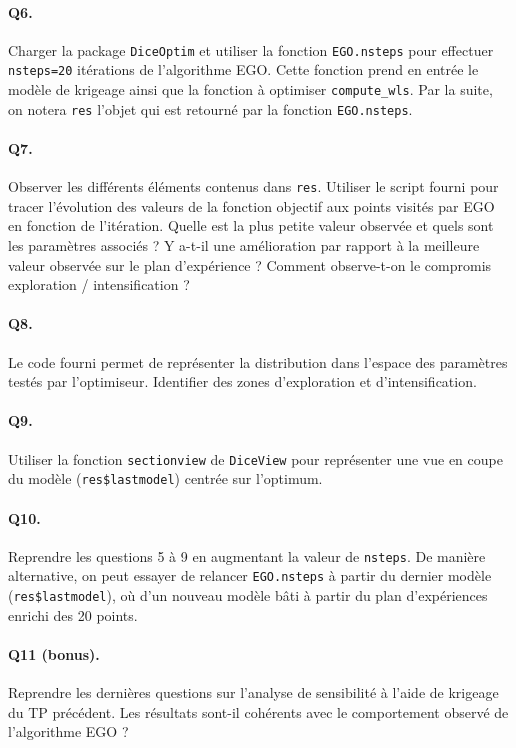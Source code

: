 \documentclass[12pt]{scrartcl}
\begin{document}
\paragraph{Q6. } Charger la package \texttt{DiceOptim} et utiliser la fonction \texttt{EGO.nsteps} pour effectuer \texttt{nsteps=20} itérations de l'algorithme EGO. 
Cette fonction prend en entrée le modèle de krigeage ainsi que la fonction à optimiser \texttt{compute\_wls}. Par la suite, on notera \texttt{res} l'objet qui est retourné par la fonction \texttt{EGO.nsteps}.

\paragraph{Q7. } Observer les différents éléments contenus dans \texttt{res}. Utiliser le script fourni pour tracer l'évolution des valeurs de la fonction objectif aux points visités par EGO en fonction de l'itération. 
Quelle est la plus petite valeur observée et quels sont les paramètres associés ? Y a-t-il une amélioration par rapport à la meilleure valeur observée sur le plan d'expérience ?
Comment observe-t-on le compromis exploration / intensification ?

\paragraph{Q8. } Le code fourni permet de représenter la distribution dans l'espace des paramètres testés par l'optimiseur. Identifier des zones d'exploration et d'intensification.

\paragraph{Q9. } Utiliser la fonction \texttt{sectionview} de \texttt{DiceView} pour représenter une vue en coupe du modèle (\texttt{res\$lastmodel}) centrée sur l'optimum.

\paragraph{Q10. } Reprendre les questions 5 à 9 en augmentant la valeur de \texttt{nsteps}. De manière alternative, on peut essayer de relancer \texttt{EGO.nsteps} à partir du dernier modèle (\texttt{res\$lastmodel}), 
où d'un nouveau modèle bâti à partir du plan d'expériences enrichi des 20 points.

\paragraph{Q11 (bonus). } Reprendre les dernières questions sur l'analyse de sensibilité à l'aide de krigeage du TP précédent. Les résultats sont-il cohérents avec le comportement observé de l'algorithme EGO ?
\end{document}
